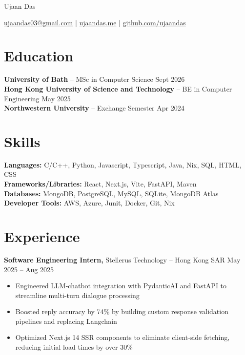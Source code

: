 \documentclass[11pt]{article}       %
\begin{document}
\centerline{\Huge Ujaan Das}

\vspace{5pt}

\centerline{\href{mailto:ujaandas03@gmail.com}{ujaandas03@gmail.com} | \href{https://ujaandas.me}{ujaandas.me} | \href{https://github.com/ujaandas}{github.com/ujaandas}}

\vspace{-10pt}

\section*{Education}
\textbf{University of Bath} -- MSc in Computer Science \hfill Sept 2026 \\
\textbf{Hong Kong University of Science and Technology} -- BE in Computer Engineering \hfill May 2025 \\
\textbf{Northwestern University} -- Exchange Semester \hfill Apr 2024

\vspace{-6.5pt}


\section*{Skills}
\textbf{Languages:} C/C++, Python, Javascript, Typescript, Java, Nix, SQL, HTML, CSS \\
\textbf{Frameworks/Libraries:} React, Next.js, Vite, FastAPI, Maven \\
\textbf{Databases:} MongoDB, PostgreSQL, MySQL, SQLite, MongoDB Atlas \\
\textbf{Developer Tools:} AWS, Azure, Junit, Docker, Git, Nix

\vspace{-6.5pt}

\section*{Experience}

\textbf{Software Engineering Intern,} {\small Stellerus Technology} -- Hong Kong SAR \hfill May 2025 -- Aug 2025 \\
\vspace{-9pt}
\begin{itemize}
 \item Engineered LLM-chatbot integration with PydanticAI and FastAPI to streamline multi-turn dialogue processing
  \item Boosted reply accuracy by 74\% by building custom response validation pipelines and replacing Langchain 
  \item Optimized Next.js 14 SSR components to eliminate client-side fetching, reducing initial load times by over 30\%
\end{itemize}
\end{document}
